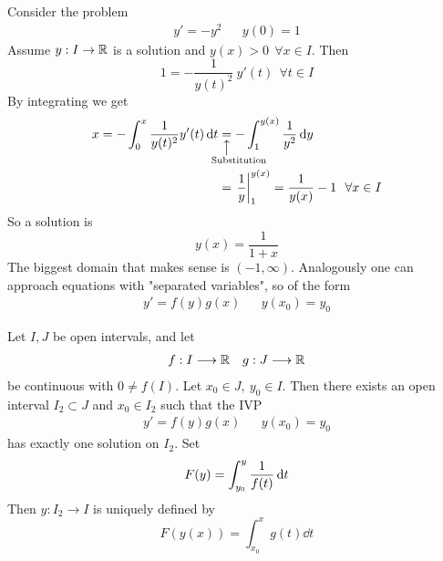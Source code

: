\documentclass[../../script.tex]{subfiles}
\begin{document}
\begin{eg}
    Consider the problem 
    \begin{align*}
        y' = -y^2 && y(0) = 1
    \end{align*}
    Assume $y: I \rightarrow \mathbb{R}$ is a solution and $y(x) > 0 ~~\forall x \in I$. Then 
    \[
        1 = -\frac{1}{y(t)^2} ~y'(t) ~~\forall t \in I
    \]
    By integrating we get 
    \begin{align*}
        x = -\int_0^x \frac{1}{y(t)^2} y'(t) \dd{t} &\equalexpl{Substitution} -\int_1^{y(x)} \rec{y^2} \dd{y} \\
        &= \left. \rec{y} \right\vert_1^{y(x)} = \rec{y(x)} - 1 ~~\forall x \in I
    \end{align*}
    So a solution is 
    \[
        y(x) = \frac{1}{1+x}
    \]
    The biggest domain that makes sense is $(-1, \infty)$. Analogously one can approach equations with "separated variables", so of the form 
    \begin{align*}
        y' = f(y)g(x) && y(x_0) = y_0
    \end{align*}
\end{eg}

\begin{thm}
    Let $I, J$ be open intervals, and let 
    \begin{align*}
        f: I \longrightarrow \mathbb{R} && g: J \longrightarrow \mathbb{R} 
    \end{align*}
    be continuous with $0 \ne f(I)$. Let $x_0 \in J, ~y_0 \in I$.
    Then there exists an open interval $I_2 \subset J$ and $x_0 \in I_2$ such that the IVP
    \begin{align*}
        y' = f(y)g(x) && y(x_0) = y_0
    \end{align*}
    has exactly one solution on $I_2$. Set 
    \[
        F(y) = \int_{y_0}^y \frac{1}{f(t)} \dd{t}
    \]
    Then $y: I_2 \rightarrow I$ is uniquely defined by 
    \[
        F(y(x)) = \int_{x_0}^x g(t) \dd{t}
    \]
\end{thm}
\end{document}
